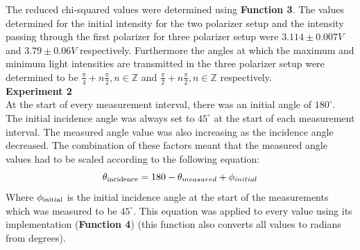 \documentclass[
	letterpaper, %
	10pt, %
]{CSUniSchoolLabReport}
\begin{document}
The reduced chi-squared values were determined using \textbf{Function 3}. The values determined
for the initial intensity for the two polarizer setup and the intensity passing through the
first polarizer for three polarizer setup were $3.114 \pm 0.007V$ and $3.79 \pm 0.06V$ respectively.
Furthermore the angles at which the maximum and minimum light intensities are transmitted in the
three polarizer setup were determined to be $\frac{\pi}{4} + n\frac{\pi}{2}, n\in\mathbb{Z}$ and
$\frac{\pi}{2} + n\frac{\pi}{2} , n\in\mathbb{Z}$
respectively.\\


\textbf{Experiment 2}\\
At the start of every measurement interval, there was an initial angle of $180^\circ$.
The initial incidence angle was always set to $45^\circ$ at the start of each measurement
interval. The measured angle value was also increasing as the incidence angle decreased.
The combination of these factors meant that the measured angle values had to be scaled according
to the following equation:
$$\theta_{\rm incidence} = 180-\theta_{measured} + \phi_{initial}$$
Where $\phi_{\rm initial}$ is the initial incidence angle at the start of the measurements which was measured
to be $45^\circ$. This equation was applied to every value using its implementation (\textbf{Function 4})
(this function also converts all values to radians from degrees).\\
\end{document}
